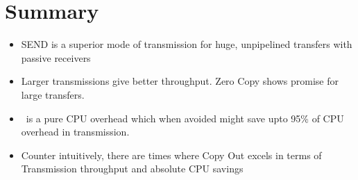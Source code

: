 
  \section{Summary}

  \begin{itemize}
   \item SEND is a superior mode of transmission for huge, unpipelined transfers with passive receivers
   \item Larger transmissions give better throughput. Zero Copy shows promise for large transfers.
   \item \memcpy ~is a pure CPU overhead which when avoided might save upto 95\% of CPU overhead in transmission.
   \item Counter intuitively, there are times where Copy Out excels in terms of Transmission throughput and absolute CPU savings
  \end{itemize}

%

%

